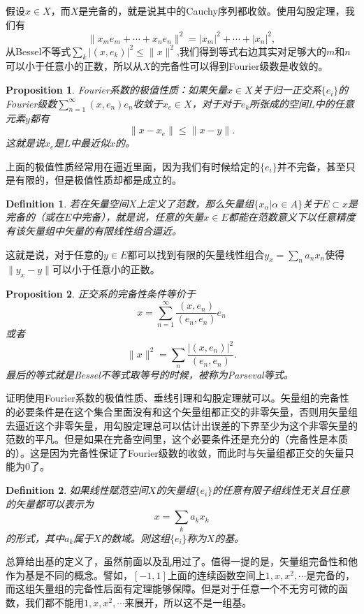 \documentclass[10pt]{book}
\theoremstyle{plain}%
\newtheorem{pro}{Proposition}[chapter]%
\newtheorem{defi}{Definition}[chapter]%
\begin{document}
假设$x\in X$，而$X$是完备的，就是说其中的Cauchy序列都收敛。使用勾股定理，我们有
\[
	\| x_me_m+\cdots+x_ne_n\|^2=|x_m|^2+\cdots+|x_n|^2,
\]
从Bessel不等式$\sum_k |(x,e_k)|^2\leq \|x\|^2$,我们得到等式右边其实对足够大的$m$和$n$可以小于任意小的正数，所以从$X$的完备性可以得到Fourier级数是收敛的。
\begin{pro}
Fourier系数的极值性质：如果矢量$x\in X$关于归一正交系$\{e_i\}$的Fourier级数$\sum_{n=1}^\infty (x,e_n)e_n$收敛于$x_e\in X$，对于对于$e_k$所张成的空间$L$中的任意元素$y$都有
\[
	\|x-x_e\|\leq \|x-y\|.
\]
这就是说$x_e$是$L$中最近似$x$的。
\end{pro}
上面的极值性质经常用在逼近里面，因为我们有时候给定的$\{e_i\}$并不完备，甚至只是有限的，但是极值性质却都是成立的。
\begin{defi}
若在矢量空间$X$上定义了范数，那么矢量组$\{x_\alpha|\alpha\in A\}$关于$E \subset x$是完备的（或在$E$中完备），就是说，任意的矢量$x\in E$都能在范数意义下以任意精度有该矢量组中矢量的有限线性组合逼近。
\end{defi}
这就是说，对于任意的$y\in E$都可以找到有限的矢量线性组合$y_x=\sum_{n}a_n x_n$使得$\|y_x-y\|$可以小于任意小的正数。

\begin{pro}
正交系的完备性条件等价于
\[
	x=\sum_{n=1}^\infty \frac{(x,e_n)}{(e_n,e_n)}e_n
\]
或者
\[
	\|x\|^2=\sum_n \frac{|(x,e_n)|^2}{(e_n,e_n)}.
\]
最后的等式就是Bessel不等式取等号的时候，被称为Parseval等式。
\end{pro}
证明使用Fourier系数的极值性质、垂线引理和勾股定理就可以。矢量组的完备性的必要条件是在这个集合里面没有和这个矢量组都正交的非零矢量，否则用矢量组去逼近这个非零矢量，用勾股定理总可以估计出误差的下界至少为这个非零矢量的范数的平凡。但是如果在完备空间里，这个必要条件还是充分的（完备性是本质的）。这是因为完备性保证了Fourier级数的收敛，而此时与矢量组都正交的矢量只能为0了。
\begin{defi}
如果线性赋范空间$X$的矢量组$\{e_i\}$的任意有限子组线性无关且任意的矢量都可以表示为
\[
x=\sum_ka_kx_k
\]的形式，其中$a_k$属于$X$的数域。则这组$\{e_i\}$称为$X$的基。
\end{defi}
总算给出基的定义了，虽然前面以及乱用过了。值得一提的是，矢量组完备性和他作为基是不同的概念。譬如，$[-1,1]$上面的连续函数空间上$1,x,x^2,\cdots$是完备的，而这组矢量组的完备性后面有定理能够保障。但是对于任意一个不无穷可微的函数，我们都不能用$1,x,x^2,\cdots$来展开，所以这不是一组基。
\end{document}
